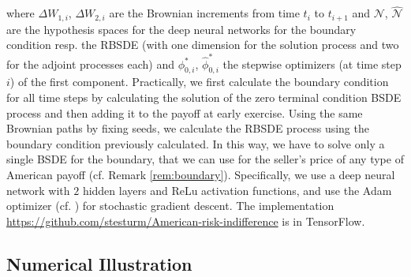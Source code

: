 \documentclass{article}
\begin{document}
where $\Delta W_{1,i}$, $\Delta W_{2,i}$ are the Brownian increments from time $t_i$ to $t_{i+1}$ and $\mathcal{N}$, $\hat{\mathcal{N}}$ are the hypothesis spaces for the deep neural networks for the boundary condition resp. the RBSDE (with one dimension for the solution process and two for the adjoint processes each) and $\phi^*_{0, i}$, $\hat{\phi}^*_{0, i}$ the stepwise optimizers (at time step $i$) of the first component. Practically, we first calculate the boundary condition for all time steps by calculating the solution of the zero terminal condition BSDE process and then adding it to the payoff at early exercise. Using the same Brownian paths by fixing seeds, we calculate the RBSDE process using the boundary condition previously calculated.  In this way, we have to solve only a single BSDE for the boundary, that we can use for the seller's  price of any type of American payoff  (cf. Remark \ref{rem:boundary}). Specifically, we use a deep neural network with $2$ hidden layers and ReLu activation functions, and use the Adam optimizer (cf. \cite{KB17}) for stochastic gradient descent. The implementation \url{https://github.com/stesturm/American-risk-indifference} is in TensorFlow.



\subsection{Numerical Illustration}
\end{document}

